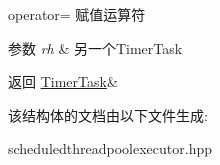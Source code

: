 operator= 赋值运算符 


\begin{DoxyParams}{参数}
{\em rh} & 另一个\+Timer\+Task\\
\hline
\end{DoxyParams}
\begin{DoxyReturn}{返回}
\hyperlink{structTimerTask}{Timer\+Task}\& 
\end{DoxyReturn}


该结构体的文档由以下文件生成\+:\begin{DoxyCompactItemize}
\item 
scheduledthreadpoolexecutor.\+hpp\end{DoxyCompactItemize}
